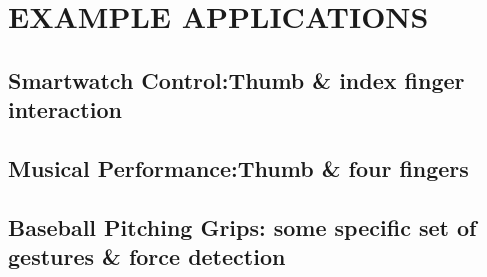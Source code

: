 \documentclass{sigchi}
\begin{document}
\section{EXAMPLE APPLICATIONS}

\subsection{Smartwatch Control:Thumb \& index finger interaction}
    
\subsection{Musical Performance:Thumb \& four fingers}
    
\subsection{Baseball Pitching Grips: some specific set of gestures \& force detection}
    


\end{document}
